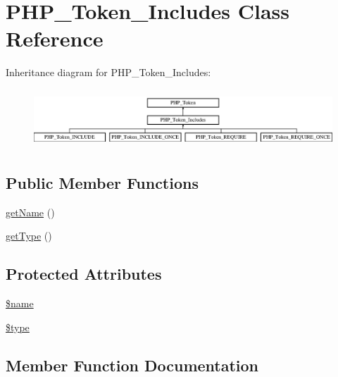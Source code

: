 \hypertarget{class_p_h_p___token___includes}{}\section{P\+H\+P\+\_\+\+Token\+\_\+\+Includes Class Reference}
\label{class_p_h_p___token___includes}
Inheritance diagram for P\+H\+P\+\_\+\+Token\+\_\+\+Includes\+:\begin{figure}[H]
\begin{center}
\leavevmode
\includegraphics[height=2.222222cm]{class_p_h_p___token___includes}
\end{center}
\end{figure}
\subsection*{Public Member Functions}
\begin{DoxyCompactItemize}
\item 
\mbox{\hyperlink{class_p_h_p___token___includes_a3d0963e68bb313b163a73f2803c64600}{get\+Name}} ()
\item 
\mbox{\hyperlink{class_p_h_p___token___includes_a830b5c75df72b32396701bc563fbe3c7}{get\+Type}} ()
\end{DoxyCompactItemize}
\subsection*{Protected Attributes}
\begin{DoxyCompactItemize}
\item 
\mbox{\hyperlink{class_p_h_p___token___includes_ab2fc40d43824ea3e1ce5d86dee0d763b}{\$name}}
\item 
\mbox{\hyperlink{class_p_h_p___token___includes_a9a4a6fba2208984cabb3afacadf33919}{\$type}}
\end{DoxyCompactItemize}


\subsection{Member Function Documentation}
\mbox{\label{class_p_h_p___token___includes_a3d0963e68bb313b163a73f2803c64600}} 
